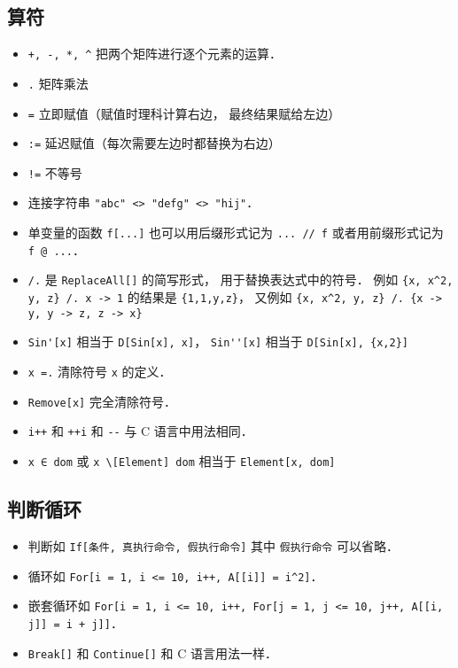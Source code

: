 \subsection{算符}
\begin{itemize}
\item \verb|+, -, *, ^| 把两个矩阵进行逐个元素的运算．
\item \verb|.| 矩阵乘法
\item \verb|=| 立即赋值（赋值时理科计算右边， 最终结果赋给左边）
\item \verb|:=| 延迟赋值（每次需要左边时都替换为右边）
\item \verb|!=| 不等号
\item 连接字符串 \verb|"abc" <> "defg" <> "hij"|．
\item 单变量的函数 \verb|f[...]| 也可以用后缀形式记为 \verb|... // f| 或者用前缀形式记为 \verb|f @ ...|．
\item \verb|/.| 是 \verb|ReplaceAll[]| 的简写形式， 用于替换表达式中的符号． 例如 \verb|{x, x^2, y, z} /. x -> 1| 的结果是 \verb|{1,1,y,z}|， 又例如 \verb|{x, x^2, y, z} /. {x -> y, y -> z, z -> x}|
\item \verb|Sin'[x]| 相当于 \verb|D[Sin[x], x]|， \verb|Sin''[x]| 相当于 \verb|D[Sin[x], {x,2}]|
\item \verb|x =.| 清除符号 \verb|x| 的定义．
\item \verb|Remove[x]| 完全清除符号．
\item \verb|i++| 和 \verb|++i| 和 \verb|--| 与 C 语言中用法相同．
\item \verb|x ∈ dom| 或 \verb|x \[Element] dom| 相当于 \verb|Element[x, dom]|
\end{itemize}

\subsection{判断循环}
\begin{itemize}
\item 判断如 \verb|If[条件, 真执行命令, 假执行命令]| 其中 \verb|假执行命令| 可以省略．
\item 循环如 \verb|For[i = 1, i <= 10, i++, A[[i]] = i^2]|．
\item 嵌套循环如 \verb|For[i = 1, i <= 10, i++, For[j = 1, j <= 10, j++, A[[i, j]] = i + j]]|．
\item \verb|Break[]| 和 \verb|Continue[]| 和 C 语言用法一样．
\end{itemize}

